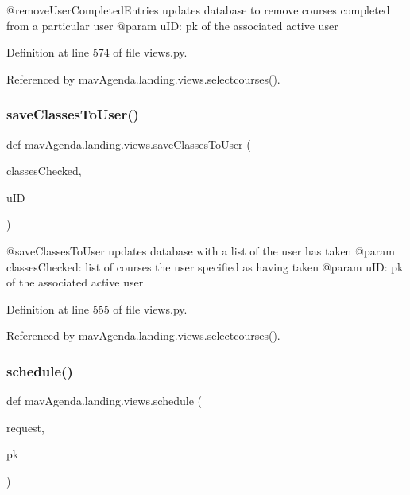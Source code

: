\begin{DoxyVerb}@removeUserCompletedEntries updates database to remove courses completed from a particular user
@param uID: pk of the associated active user
\end{DoxyVerb}
 

Definition at line 574 of file views.\+py.



Referenced by mav\+Agenda.\+landing.\+views.\+selectcourses().

\mbox{\label{namespacemavAgenda_1_1landing_1_1views_a09ee653c730bd8eb540ef674eebf01d3}} 
\subsubsection{\texorpdfstring{save\+Classes\+To\+User()}{saveClassesToUser()}}
{\footnotesize\ttfamily def mav\+Agenda.\+landing.\+views.\+save\+Classes\+To\+User (\begin{DoxyParamCaption}\item[{}]{classes\+Checked,  }\item[{}]{u\+ID }\end{DoxyParamCaption})}

\begin{DoxyVerb}@saveClassesToUser updates database with a list of the user has taken
@param classesChecked: list of courses the user specified as having taken
@param uID: pk of the associated active user
\end{DoxyVerb}
 

Definition at line 555 of file views.\+py.



Referenced by mav\+Agenda.\+landing.\+views.\+selectcourses().

\mbox{\label{namespacemavAgenda_1_1landing_1_1views_a38b95502a945bfe5e450db9b88dd802f}} 
\subsubsection{\texorpdfstring{schedule()}{schedule()}}
{\footnotesize\ttfamily def mav\+Agenda.\+landing.\+views.\+schedule (\begin{DoxyParamCaption}\item[{}]{request,  }\item[{}]{pk }\end{DoxyParamCaption})}

